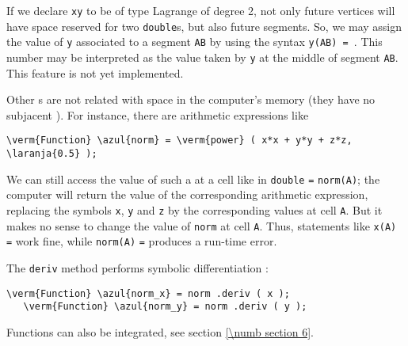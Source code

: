 If we declare {\small\tt xy} to be of type Lagrange of degree 2, not only future vertices will
have space reserved for two {\small\tt double}s, but also future segments.
So, we may assign the value of {\small\tt y} associated to a segment {\small\tt AB} by using
the syntax {\small\tt y(AB) = }.
This number may be interpreted as the value taken by {\small\tt y} at the middle of
segment {\small\tt AB}.
This feature is not yet implemented.

Other {\small\tt{}}s are not related with space in the computer's memory
(they have no subjacent {\small\tt{}}).
For instance, there are arithmetic expressions like 

\begin{Verbatim}[commandchars=\\\{\},formatcom=\small\tt,baselinestretch=0.94]
   \verm{Function} \azul{norm} = \verm{power} ( x*x + y*y + z*z, \laranja{0.5} );
\end{Verbatim}

We can still access the value of such a {\small\tt{}} at a cell like in
{\small\tt double} {\small\tt{}} {\small\tt =} {\small\tt norm(A)};
the computer will return the value of the corresponding arithmetic expression,
replacing the symbols {\small\tt x}, {\small\tt y} and {\small\tt z} by the corresponding
values at cell {\small\tt A}.
But it makes no sense to change the value of {\small\tt norm} at cell {\small\tt A}.
Thus, statements like {\small\tt x(A)} {\small\tt =} {\small\tt{}} work fine,
while {\small\tt norm(A)} {\small\tt =} {\small\tt{}} produces a run-time error.

The {\small\tt deriv} method performs symbolic differentiation :

\begin{Verbatim}[commandchars=\\\{\},formatcom=\small\tt,
   baselinestretch=0.94,framesep=2mm                     ]
   \verm{Function} \azul{norm_x} = norm .deriv ( x );
   \verm{Function} \azul{norm_y} = norm .deriv ( y );
\end{Verbatim}

Functions can also be integrated, see section \ref{\numb section 6}.


